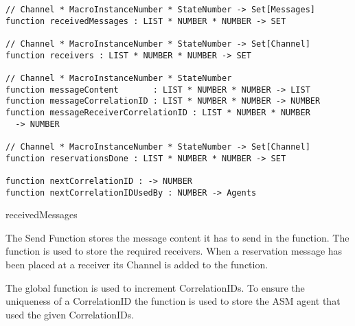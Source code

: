 \begin{listing}[htbp]
\begin{verbatim}
// Channel * MacroInstanceNumber * StateNumber -> Set[Messages]
function receivedMessages : LIST * NUMBER * NUMBER -> SET

// Channel * MacroInstanceNumber * StateNumber -> Set[Channel]
function receivers : LIST * NUMBER * NUMBER -> SET

// Channel * MacroInstanceNumber * StateNumber
function messageContent       : LIST * NUMBER * NUMBER -> LIST
function messageCorrelationID : LIST * NUMBER * NUMBER -> NUMBER
function messageReceiverCorrelationID : LIST * NUMBER * NUMBER
  -> NUMBER

// Channel * MacroInstanceNumber * StateNumber -> Set[Channel]
function reservationsDone : LIST * NUMBER * NUMBER -> SET

function nextCorrelationID : -> NUMBER
function nextCorrelationIDUsedBy : NUMBER -> Agents
\end{verbatim}
\caption{receivedMessages}
\label{lst:shortasm:receivedMessages}
\end{listing}


The Send Function stores the message content it has to send in the
 function. The  function is used to store the required receivers. When a reservation message has been placed at a receiver its Channel is added to the  function.

The global function  is used to increment CorrelationIDs. To ensure the uniqueness of a CorrelationID the  function is used to store the ASM agent that used the given CorrelationIDs.


